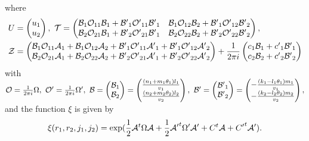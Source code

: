\documentclass[12pt, a4paper]{article}
\begin{document}
where \begin{align*}
  U & = \begin{pmatrix} u_1 \\ u_2 \end{pmatrix}, \
 {\cal T}  =
\begin{pmatrix} {\cal B}_1 {\cal O}_{11} {\cal B}_1 + {\cal B'}_1 {\cal O'}_{11} {\cal B'}_1
 & {\cal B}_1 {\cal O}_{12} {\cal B}_2 + {\cal B'}_1 {\cal O'}_{12} {\cal B'}_2 \\
 {\cal B}_2 {\cal O}_{21} {\cal B}_1 + {\cal B'}_2 {\cal O'}_{21} {\cal B'}_1
  & {\cal B}_2 {\cal O}_{22} {\cal B}_2 + {\cal B'}_2 {\cal O'}_{22} {\cal B'}_2
\end{pmatrix}   ,  \\
     {\cal Z} & = \begin{pmatrix} {\cal B}_1 {\cal O}_{11} {\cal A}_1
     + {\cal B}_1 {\cal O}_{12} {\cal A}_2
     + {\cal B'}_1 {\cal O'}_{11} {{\cal A}'}_1
      + {\cal B'}_1 {\cal O'}_{12} {{\cal A}'}_2
  \\
   {\cal B}_2 {\cal O}_{21} {\cal A}_1
     + {\cal B}_2 {\cal O}_{22} {\cal A}_2
     + {\cal B'}_2 {\cal O'}_{21} {{\cal A}'}_1
      + {\cal B'}_2 {\cal O'}_{22} {{\cal A}'}_2
  \end{pmatrix}
  + \frac{1}{2 \pi i} \begin{pmatrix}
    c_1 {\cal B}_1 + {c'}_1 {\cal B'}_1 \\
    c_2 {\cal B}_2 + {c'}_2 {\cal B'}_2
  \end{pmatrix}
   \end{align*}
   with
  \(  {\cal O} = \frac{1}{2 \pi i} \Omega , \
     {\cal O'} = \frac{1}{2 \pi i} \Omega' , \
   {\cal B}  = \begin{pmatrix}
    {\cal B}_1  \\   {\cal B}_2   \end{pmatrix} =
\begin{pmatrix} \frac{(n_1 +m_1 \theta_1)l_1}{v_1} \\
            \frac{(n_2 +m_2 \theta_2)l_2}{v_2}  \end{pmatrix} ,  \
     {\cal B}' = \begin{pmatrix}
    {\cal B'}_1 \\   {\cal B'}_2    \end{pmatrix}
      =  \begin{pmatrix} -\frac{(k_1-l_1\theta_1)m_1}{v_1} \\
  -\frac{(k_2-l_2\theta_2)m_2}{v_2}
 \end{pmatrix}    , \)
 and the function $\xi $ is given by
\[ \xi(r_1,r_2,j_1,j_2) = \exp ( \frac{1}{2} {\cal A}^t \Omega {\cal A} + \frac{1}{2}
{{\cal A}'}^t \Omega' {\cal A}' + C^t {\cal A} + {C'}^t {\cal A}')
 . \]
\end{document}
